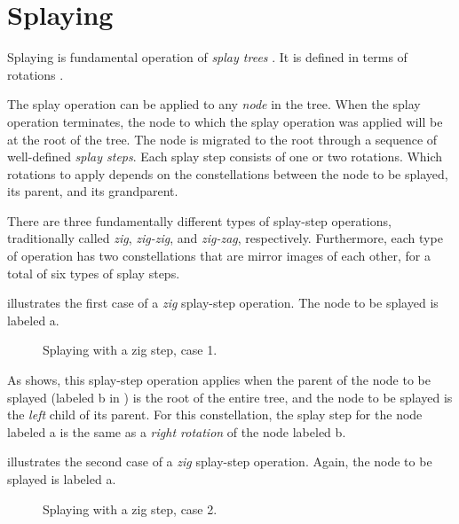 \section{Splaying}
\label{sec-splaying}

Splaying is fundamental operation of \emph{splay trees}
\cite{Sleator:1985:SBS:3828.3835}.  It is defined in terms of
rotations .

The splay operation can be applied to any \emph{node} in the tree.
When the splay operation terminates, the node to which the splay
operation was applied will be at the root of the tree.  The node is
migrated to the root through a sequence of well-defined \emph{splay
  steps}.  Each splay step consists of one or two rotations.  Which
rotations to apply depends on the constellations between the node to
be splayed, its parent, and its grandparent.

There are three fundamentally different types of splay-step
operations, traditionally called \emph{zig}, \emph{zig-zig}, and
\emph{zig-zag}, respectively.  Furthermore, each type of operation has
two constellations that are mirror images of each other, for a total
of six types of splay steps.

 illustrates the first case of a \emph{zig}
splay-step operation.  The node to be splayed is labeled \textsf{a}.

\begin{figure}
\begin{center}
\end{center}
\caption{\label{fig-splay-zig-1}
Splaying with a zig step, case 1.}
\end{figure}

As  shows, this splay-step operation applies
when the parent of the node to be splayed (labeled \textsf{b} in
) is the root of the entire tree, and the node
to be splayed is the \emph{left} child of its parent.  For this
constellation, the splay step for the node labeled \textsf{a} is the
same as a \emph{right rotation} of the node labeled \textsf{b}.

 illustrates the second case of a \emph{zig}
splay-step operation.  Again, the node to be splayed is labeled
\textsf{a}.

\begin{figure}
\begin{center}
\end{center}
\caption{\label{fig-splay-zig-2}
Splaying with a zig step, case 2.}
\end{figure}

